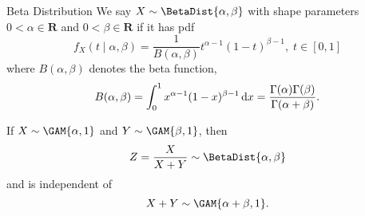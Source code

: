 \begin{Definition}{Beta Distribution}{}
    We say $ X \sim \BetaDist{\alpha,\beta} $ with shape parameters $ 0<\alpha\in\mathbf{R} $ and $ 0<\beta\in\mathbf{R} $ if it has pdf
    \[ f_X(t\mid \alpha,\beta)=\frac{1}{B(\alpha,\beta)}t^{\alpha-1}(1-t)^{\beta-1},\; t\in[0,1] \]
    where $ B(\alpha,\beta) $ denotes the beta function,
    \[ B(\alpha,\beta)=\int_{0}^{1}x^{\alpha-1}(1-x)^{\beta-1}\odif{x}=
        \frac{\Gamma(\alpha)\Gamma(\beta)}{\Gamma(\alpha+\beta)}. \]
\end{Definition}
\begin{Theorem}{}{}
    If $ X \sim \GAM{\alpha,1} $ and $ Y \sim \GAM{\beta,1} $, then
    \[ Z=\frac{X}{X+Y}\sim \BetaDist{\alpha,\beta} \]
    and is independent of
    \[ X+Y \sim \GAM{\alpha+\beta,1}. \]
\end{Theorem}